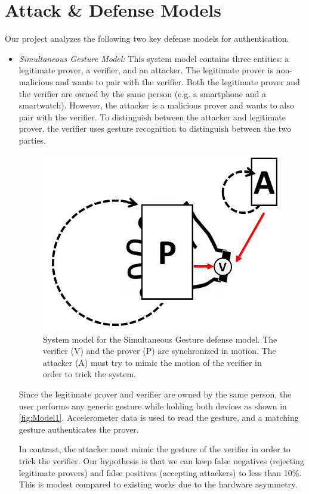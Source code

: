 
\section{Attack \& Defense Models}
\label{sec:Attacks}

Our project analyzes the following two key defense models for authentication.

\begin{itemize}
\item \emph{Simultaneous Gesture Model:} This system model contains three entities: a legitimate prover, a verifier, and an attacker. The legitimate prover is non-malicious and wants to pair with the verifier. Both the legitimate prover and the verifier are owned by the same person (e.g. a smartphone and a smartwatch). However, the attacker is a malicious prover and wants to also pair with the verifier. To distinguish between the attacker and legitimate prover, the verifier uses gesture recognition to distinguish between the two parties. 

\begin{figure}[!tb]
\centering
\includegraphics[width=0.65 \linewidth]{./figures/model1.png}
\caption{System model for the Simultaneous Gesture defense model. The verifier (V) and the prover (P) are synchronized in motion. The attacker (A) must try to mimic the motion of the verifier in order to trick the system.}
\label{fig:Model1}
\end{figure}

Since the legitimate prover and verifier are owned by the same person, the user performs any generic gesture while holding both devices as shown in \autoref{fig:Model1}. Accelerometer data is used to read the gesture, and a matching gesture authenticates the prover.

In contrast, the attacker must mimic the gesture of the verifier in order to trick the verifier. Our hypothesis is that we can keep false negatives (rejecting legitimate provers) and false positives (accepting attackers) to less than 10\%. This is modest compared to existing works due to the hardware asymmetry.  


\end{itemize}
